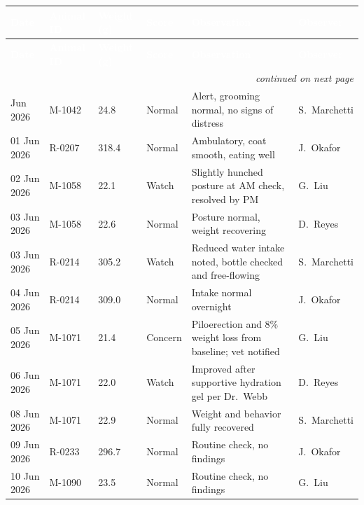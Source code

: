 \documentclass[11pt]{scrreprt}
\begin{document}
\begin{footnotesize}
\begin{longtable}{@{}p{1.5cm}p{1.6cm}p{1.4cm}p{1.3cm}p{4.6cm}p{1.9cm}@{}}
\toprule
\rowcolor{vivteal}
\textcolor{white}{\textbf{Date}} & \textcolor{white}{\textbf{Animal ID}} &
\textcolor{white}{\textbf{Weight (g)}} & \textcolor{white}{\textbf{Score}} &
\textcolor{white}{\textbf{Observation}} & \textcolor{white}{\textbf{Observer}} \\
\midrule
\endfirsthead
\rowcolor{vivteal}
\textcolor{white}{\textbf{Date}} & \textcolor{white}{\textbf{Animal ID}} &
\textcolor{white}{\textbf{Weight (g)}} & \textcolor{white}{\textbf{Score}} &
\textcolor{white}{\textbf{Observation}} & \textcolor{white}{\textbf{Observer}} \\
\midrule
\endhead
\bottomrule
\multicolumn{6}{r}{\footnotesize\itshape continued on next page}\\
\endfoot
\bottomrule
\endlastfoot
01 Jun 2026 & M-1042 & 24.8 & \cellcolor{vivteal!25}Normal & Alert, grooming normal, no signs of distress & S.\ Marchetti \\
01 Jun 2026 & R-0207 & 318.4 & \cellcolor{vivteal!25}Normal & Ambulatory, coat smooth, eating well & J.\ Okafor \\
02 Jun 2026 & M-1058 & 22.1 & \cellcolor{vivamber!35}Watch & Slightly hunched posture at AM check, resolved by PM & G.\ Liu \\
03 Jun 2026 & M-1058 & 22.6 & \cellcolor{vivteal!25}Normal & Posture normal, weight recovering & D.\ Reyes \\
03 Jun 2026 & R-0214 & 305.2 & \cellcolor{vivamber!35}Watch & Reduced water intake noted, bottle checked and free-flowing & S.\ Marchetti \\
04 Jun 2026 & R-0214 & 309.0 & \cellcolor{vivteal!25}Normal & Intake normal overnight & J.\ Okafor \\
05 Jun 2026 & M-1071 & 21.4 & \cellcolor{vivalert!30}Concern & Piloerection and 8\% weight loss from baseline; vet notified & G.\ Liu \\
06 Jun 2026 & M-1071 & 22.0 & \cellcolor{vivamber!35}Watch & Improved after supportive hydration gel per Dr.\ Webb & D.\ Reyes \\
08 Jun 2026 & M-1071 & 22.9 & \cellcolor{vivteal!25}Normal & Weight and behavior fully recovered & S.\ Marchetti \\
09 Jun 2026 & R-0233 & 296.7 & \cellcolor{vivteal!25}Normal & Routine check, no findings & J.\ Okafor \\
10 Jun 2026 & M-1090 & 23.5 & \cellcolor{vivteal!25}Normal & Routine check, no findings & G.\ Liu \\
\end{longtable}
\end{footnotesize}
\end{document}
